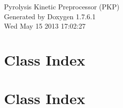 \documentclass[a4paper]{book}
\begin{document}
\hypersetup{pageanchor=false,citecolor=blue}
\begin{titlepage}
\vspace*{7cm}
\begin{center}
{\Large \-Pyrolysis \-Kinetic \-Preprocessor (\-P\-K\-P) }\\
\vspace*{1cm}
{\large \-Generated by Doxygen 1.7.6.1}\\
\vspace*{0.5cm}
{\small Wed May 15 2013 17:02:27}\\
\end{center}
\end{titlepage}
\clearemptydoublepage
{}
\tableofcontents
\clearemptydoublepage
{}
\hypersetup{pageanchor=true,citecolor=blue}
\chapter{\-Class \-Index}

\chapter{\-Class \-Index}

\end{document}

